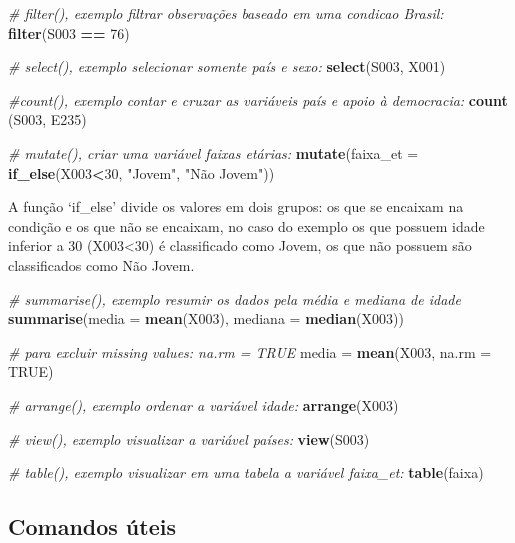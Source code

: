 \documentclass[
  brazil,
]{book}
\newenvironment{Shaded}{\begin{snugshade}}{\end{snugshade}}
\newcommand{\CommentTok}[1]{\textcolor[rgb]{0.56,0.35,0.01}{\textit{#1}}}
\newcommand{\DataTypeTok}[1]{\textcolor[rgb]{0.13,0.29,0.53}{#1}}
\newcommand{\DecValTok}[1]{\textcolor[rgb]{0.00,0.00,0.81}{#1}}
\newcommand{\KeywordTok}[1]{\textcolor[rgb]{0.13,0.29,0.53}{\textbf{#1}}}
\newcommand{\NormalTok}[1]{#1}
\newcommand{\OperatorTok}[1]{\textcolor[rgb]{0.81,0.36,0.00}{\textbf{#1}}}
\newcommand{\OtherTok}[1]{\textcolor[rgb]{0.56,0.35,0.01}{#1}}
\newcommand{\StringTok}[1]{\textcolor[rgb]{0.31,0.60,0.02}{#1}}
\begin{document}
\begin{Shaded}
\begin{Highlighting}[]
\CommentTok{# filter(), exemplo filtrar observações baseado em uma condicao Brasil: }
\KeywordTok{filter}\NormalTok{(S003 }\OperatorTok{==}\StringTok{ }\DecValTok{76}\NormalTok{)}

\CommentTok{# select(), exemplo selecionar somente país e sexo: }
\KeywordTok{select}\NormalTok{(S003, X001)}

\CommentTok{#count(), exemplo contar e cruzar as variáveis país e apoio à democracia: }
\KeywordTok{count}\NormalTok{ (S003, E235) }

\CommentTok{# mutate(), criar uma variável faixas etárias: }
\KeywordTok{mutate}\NormalTok{(}\DataTypeTok{faixa_et =} \KeywordTok{if_else}\NormalTok{(X003}\OperatorTok{<}\DecValTok{30}\NormalTok{, }\StringTok{"Jovem"}\NormalTok{, }\StringTok{"Não Jovem"}\NormalTok{))}
\end{Highlighting}
\end{Shaded}

A função `if\_else' divide os valores em dois grupos: os que se encaixam na condição e os que não se encaixam, no caso do exemplo os que possuem idade inferior a 30 (X003\textless30) é classificado como Jovem, os que não possuem são classificados como Não Jovem.

\begin{Shaded}
\begin{Highlighting}[]
\CommentTok{# summarise(), exemplo resumir os dados pela média e mediana de idade }
\KeywordTok{summarise}\NormalTok{(}\DataTypeTok{media =} \KeywordTok{mean}\NormalTok{(X003), }\DataTypeTok{mediana =} \KeywordTok{median}\NormalTok{(X003))}

\CommentTok{# para excluir missing values: na.rm = TRUE}
\NormalTok{media =}\StringTok{ }\KeywordTok{mean}\NormalTok{(X003, }\DataTypeTok{na.rm =} \OtherTok{TRUE}\NormalTok{)}

\CommentTok{# arrange(), exemplo ordenar a variável idade: }
\KeywordTok{arrange}\NormalTok{(X003)}

\CommentTok{# view(), exemplo visualizar a variável países: }
\KeywordTok{view}\NormalTok{(S003)}

\CommentTok{# table(), exemplo visualizar em uma tabela a variável faixa_et: }
\KeywordTok{table}\NormalTok{(faixa)}
\end{Highlighting}
\end{Shaded}

\hypertarget{comandos-uxfateis}{%
\subsection{Comandos úteis}\label{comandos-uxfateis}}
\end{document}
